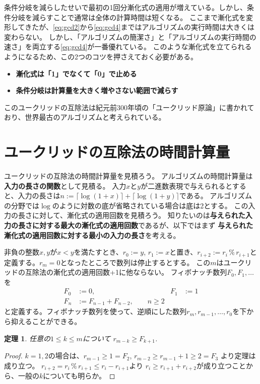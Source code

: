 \documentclass[a4paper,twoside,onecolumn,openany,article,10pt]{memoir}
\newtheorem{theorem}{定理}
\theoremstyle{remark}
\begin{document}
条件分岐を減らしたせいで最初の1回分漸化式の適用が増えている。しかし、条件分岐を減らすことで通常は全体の計算時間は短くなる。
ここまで漸化式を変形してきたが、\eqref{eq:gcd2}から\eqref{eq:gcd4}まではアルゴリズムの実行時間は大きくは変わらない。
しかし、「アルゴリズムの簡潔さ」と「アルゴリズムの実行時間の速さ」を両立する\eqref{eq:gcd4}が一番優れている。
このような漸化式を立てられるようになるため、この2つのコツを押さえておく必要がある。
\begin{itemize}
\item \textbf{漸化式は「1」でなくて「0」で止める}
\item \textbf{条件分岐は計算量を大きく増やさない範囲で減らす}
\end{itemize}
このユークリッドの互除法は紀元前300年頃の「ユークリッド原論」に書かれており、世界最古のアルゴリズムと考えられている。

\section{ユークリッドの互除法の時間計算量}\label{sec:ceuclidean}
ユークリッドの互除法の時間計算量を見積ろう。
アルゴリズムの時間計算量は\textbf{入力の長さの関数}として見積る。
入力$x$と$y$が二進数表現で与えられるとすると、入力の長さは$n:=\lceil \log(1+ x) \rceil + \lceil \log(1+y)\rceil$である。
アルゴリズムの分野では$\log$のように対数の底が省略されている場合は底は2とする。
この入力の長さに対して、漸化式の適用回数を見積ろう。
知りたいのは\textbf{与えられた入力の長さに対する最大の漸化式の適用回数}であるが、以下ではまず
\textbf{与えられた漸化式の適用回数に対する最小の入力の長さ}を考える。

非負の整数$x,y$が$x<y$を満たすとき、$r_0:=y$, $r_1:=x$と置き、$r_{i+2} := r_{i}\,\%\,r_{i+1}$と定義する。$r_m=0$となったところで数列は停止するとする。
この$m$はユークリッドの互除法の漸化式の適用回数+1に他ならない。
フィボナッチ数列$F_0,F_1,\dotsc$を
\begin{align*}
F_0 &:= 0,& F_1 &:= 1\\
F_n &:= F_{n-1} + F_{n-2}, \qquad n\ge 2
\end{align*}
と定義する。フィボナッチ数列を使って、逆順にした数列$r_m, r_{m-1}, \dotsc, r_0$を下から抑えることができる。

\begin{theorem}
任意の$1\le k \le m$について
$r_{m-k}\ge F_{k+1}$.
\end{theorem}
\begin{proof}
$k=1,2$の場合は、$r_{m-1}\ge 1 = F_2$, $r_{m-2} \ge r_{m-1} + 1 \ge 2 = F_3$ より定理は成り立つ。
$r_{i+2} = r_i\,\%\,r_{i+1} \le r_i - r_{i+1}$より $r_i \ge r_{i+1} + r_{i+2}$が成り立つことから、一般の$k$についても明らか。
\end{proof}
\end{document}
